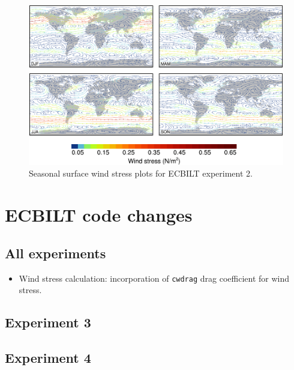 \documentclass[a4paper,11pt]{article}
\begin{document}
\begin{figure}
  \begin{center}
    \includegraphics[width=\textwidth]{../expt-2/plots/stress-plots}
  \end{center}
  \caption{Seasonal surface wind stress plots for ECBILT experiment
    2.}
  \label{fig:stress-2}
\end{figure}


\appendix
\section{ECBILT code changes}

\subsection*{All experiments}

\begin{itemize}
  \item{Wind stress calculation: incorporation of \texttt{cwdrag} drag
    coefficient for wind stress.}
\end{itemize}

\subsection*{Experiment 3}


\subsection*{Experiment 4}
\end{document}
